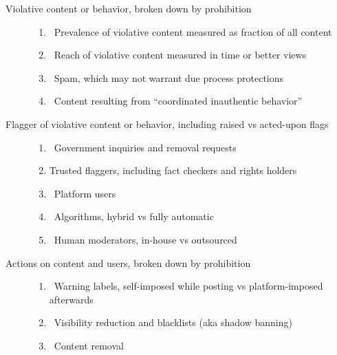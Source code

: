 
\begin{description}
\item[Violative content or behavior, broken down by prohibition]\hfill
    \begin{enumerate}
        \item {}~Prevalence of violative content measured as fraction
            of all content \label{itm:prevalence}
        \item {}~Reach of violative content measured in time
            or better views \label{itm:reach}
        \item {}~Spam, which may not warrant due process
            protections \label{itm:spam}
        \item {}~Content resulting from ``coordinated inauthentic
            behavior'' \label{itm:coordination}
    \end{enumerate}
\item[Flagger of violative content or behavior, including raised vs acted-upon flags]
    \hfill
    \begin{enumerate}[resume]
        \item {}~Government inquiries and removal requests
            \label{itm:government}
        \item {} Trusted flaggers, including fact checkers and 
            rights holders \label{itm:flaggers}
        \item {}~Platform users \label{itm:users}
        \item {}~Algorithms, hybrid vs fully automatic
            \label{itm:algorithms}
        \item {}~Human moderators, in-house vs outsourced
            \label{criterion:moderators}
    \end{enumerate}
\item[Actions on content and users, broken down by prohibition]\hfill
    \begin{enumerate}[resume]
        \item {}~Warning labels, self-imposed while posting vs
            platform-imposed afterwards \label{itm:labels}
        \item {}~Visibility reduction and blacklists (aka shadow
            banning) \label{itm:visibility}
        \item {}~Content removal \label{itm:removal}

\end{enumerate}
\end{description}
